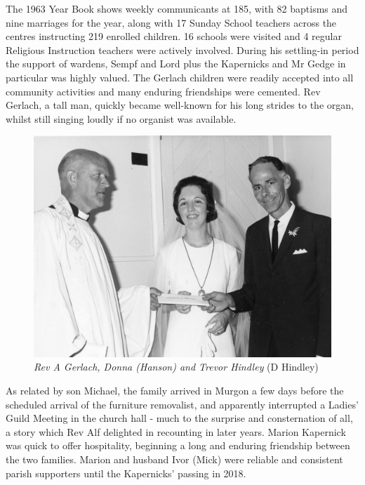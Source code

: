 The 1963 Year Book shows weekly communicants at 185, with 82 baptisms and nine marriages for the year, along with 17 Sunday School teachers across the centres instructing 219 enrolled children. 16 schools were visited and 4 regular Religious Instruction teachers were actively involved. During his settling-in period the support of wardens, Sempf and Lord plus the Kapernicks and Mr Gedge in particular was highly valued. The Gerlach children were readily accepted into all community activities and many enduring friendships were cemented. Rev Gerlach, a tall man, quickly became well-known for his long strides to the organ, whilst still singing loudly if no organist was available.









\begin{figure}
\begin{center}
\includegraphics[width=1.\linewidth,center]{../images/donnaVestry.jpg}
\caption{{\itshape Rev A Gerlach, Donna (Hanson) and Trevor Hindley} {\scriptsize(D Hindley)}}
\end{center}
\end{figure}




As related by son Michael, the family arrived in Murgon a few days before the scheduled arrival of the furniture removalist, and apparently interrupted a Ladies' Guild Meeting in the church hall - much to the surprise and consternation of all, a story which Rev Alf delighted in recounting in later years. Marion Kapernick was quick to offer hospitality, beginning a long and enduring friendship between the two families. Marion and husband Ivor (Mick) were reliable and consistent parish supporters until the Kapernicks' passing in 2018.



